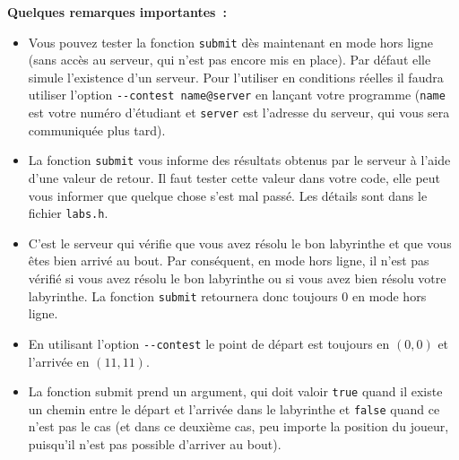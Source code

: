 \documentclass[a4paper]{article}
\begin{document}
{\bf Quelques remarques importantes~:}
\begin{itemize}
  \item Vous pouvez tester la fonction \verb|submit| dès maintenant en mode hors ligne (sans accès au serveur, qui n'est pas encore mis en place). Par défaut elle simule l'existence d'un serveur. Pour l'utiliser en conditions réelles il faudra utiliser l'option \verb|--contest name@server| en lançant votre programme (\verb|name| est votre numéro d'étudiant et \verb|server| est l'adresse du serveur, qui vous sera communiquée plus tard).
  \item La fonction \verb|submit| vous informe des résultats obtenus par le serveur à l'aide d'une valeur de retour. Il faut tester cette valeur dans votre code, elle peut vous informer que quelque chose s'est mal passé. Les détails sont dans le fichier \verb|labs.h|.
  \item C'est le serveur qui vérifie que vous avez résolu le bon labyrinthe et que vous êtes bien arrivé au bout. Par conséquent, en mode hors ligne, il n'est pas vérifié si vous avez résolu le bon labyrinthe ou si vous avez bien résolu votre labyrinthe. La fonction \verb|submit| retournera donc toujours 0 en mode hors ligne.
  \item En utilisant l'option \verb|--contest| le point de départ est toujours en $(0,0)$ et l'arrivée en $(11,11)$.
  \item La fonction submit prend un argument, qui doit valoir \verb|true| quand il existe un chemin entre le départ et l'arrivée dans le labyrinthe et \verb|false| quand ce n'est pas le cas (et dans ce deuxième cas, peu importe la position du joueur, puisqu'il n'est pas possible d'arriver au bout).
\end{itemize}
\end{document}
